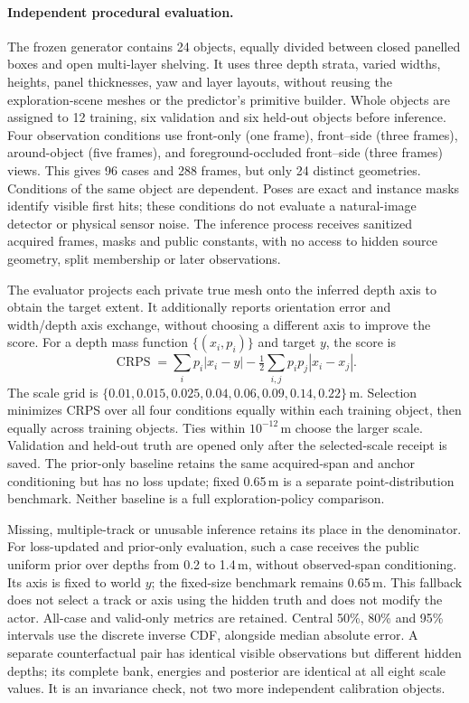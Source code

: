 \paragraph{Independent procedural evaluation.}
The frozen generator contains 24 objects, equally divided between closed
panelled boxes and open multi-layer shelving. It uses three depth strata,
varied widths, heights, panel thicknesses, yaw and layer layouts, without
reusing the exploration-scene meshes or the predictor's primitive builder.
Whole objects are assigned to 12 training, six validation and six held-out
objects before inference. Four observation conditions use front-only
(one frame), front--side (three frames), around-object (five frames), and
foreground-occluded front--side (three frames) views. This gives 96 cases and
288 frames, but only 24 distinct geometries. Conditions of the same object
are dependent. Poses are exact and instance masks identify visible first
hits; these conditions do not evaluate a natural-image detector or physical
sensor noise. The inference process receives sanitized acquired frames,
masks and public constants, with no access to hidden source geometry, split
membership or later observations.

The evaluator projects each private true mesh onto the inferred depth axis
to obtain the target extent. It additionally reports orientation error and
width/depth axis exchange, without choosing a different axis to improve the
score. For a depth mass function $\{(x_i,p_i)\}$ and target $y$, the score is
\begin{equation}
 \operatorname{CRPS}=\sum_i p_i|x_i-y|
 -\tfrac12\sum_{i,j}p_i p_j|x_i-x_j|.
\end{equation}
The scale grid is
$\{0.01,0.015,0.025,0.04,0.06,0.09,0.14,0.22\}$\,m.
Selection minimizes CRPS over all four conditions equally within each
training object, then equally across training objects. Ties within
$10^{-12}$\,m choose the larger scale. Validation and held-out truth are
opened only after the selected-scale receipt is saved. The prior-only
baseline retains the same acquired-span and anchor conditioning but has
no loss update; fixed 0.65\,m is a separate point-distribution benchmark.
Neither baseline is a full exploration-policy comparison.

Missing, multiple-track or unusable inference retains its place in the
denominator. For loss-updated and prior-only evaluation, such a case receives
the public uniform prior over depths from 0.2 to 1.4\,m, without observed-span
conditioning. Its axis is fixed to world $y$; the fixed-size benchmark remains
0.65\,m. This fallback
does not select a track or axis using the hidden truth and does not modify
the actor. All-case and valid-only metrics are retained. Central 50\%, 80\%
and 95\% intervals use the discrete inverse CDF, alongside median absolute
error. A separate counterfactual pair has identical visible observations but
different hidden depths; its complete bank, energies and posterior are
identical at all eight scale values. It is an invariance check, not two more
independent calibration objects.

